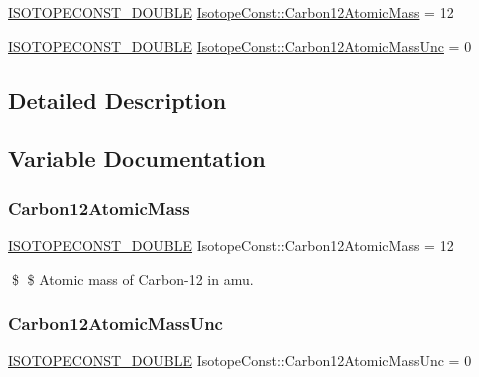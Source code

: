 \begin{DoxyCompactItemize}
\item 
\mbox{\hyperlink{group___isotope_const-_macros_ga8f45a7272ce02c0b4c65c44636ed719a}{I\+S\+O\+T\+O\+P\+E\+C\+O\+N\+S\+T\+\_\+\+D\+O\+U\+B\+LE}} \mbox{\hyperlink{group___isotope_const-_carbon-_c12_gac366a7a97813d58eeccf5b457a18afd9}{Isotope\+Const\+::\+Carbon12\+Atomic\+Mass}} = 12
\item 
\mbox{\hyperlink{group___isotope_const-_macros_ga8f45a7272ce02c0b4c65c44636ed719a}{I\+S\+O\+T\+O\+P\+E\+C\+O\+N\+S\+T\+\_\+\+D\+O\+U\+B\+LE}} \mbox{\hyperlink{group___isotope_const-_carbon-_c12_ga83454270c123e3b6062faa95523c9af3}{Isotope\+Const\+::\+Carbon12\+Atomic\+Mass\+Unc}} = 0
\end{DoxyCompactItemize}


\subsection{Detailed Description}


\subsection{Variable Documentation}
\mbox{\label{group___isotope_const-_carbon-_c12_gac366a7a97813d58eeccf5b457a18afd9}} 
\subsubsection{\texorpdfstring{Carbon12\+Atomic\+Mass}{Carbon12AtomicMass}}
{\footnotesize\ttfamily \mbox{\hyperlink{group___isotope_const-_macros_ga8f45a7272ce02c0b4c65c44636ed719a}{I\+S\+O\+T\+O\+P\+E\+C\+O\+N\+S\+T\+\_\+\+D\+O\+U\+B\+LE}} Isotope\+Const\+::\+Carbon12\+Atomic\+Mass = 12}

\$ \$ Atomic mass of Carbon-\/12 in amu. \mbox{\label{group___isotope_const-_carbon-_c12_ga83454270c123e3b6062faa95523c9af3}} 
\subsubsection{\texorpdfstring{Carbon12\+Atomic\+Mass\+Unc}{Carbon12AtomicMassUnc}}
{\footnotesize\ttfamily \mbox{\hyperlink{group___isotope_const-_macros_ga8f45a7272ce02c0b4c65c44636ed719a}{I\+S\+O\+T\+O\+P\+E\+C\+O\+N\+S\+T\+\_\+\+D\+O\+U\+B\+LE}} Isotope\+Const\+::\+Carbon12\+Atomic\+Mass\+Unc = 0}

